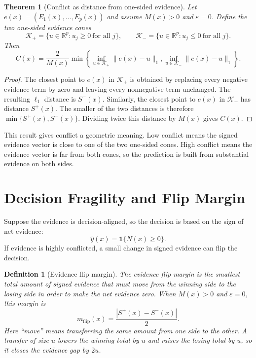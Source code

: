 \documentclass[11pt]{article}
\newtheorem{definition}{Definition}
\newtheorem{theorem}{Theorem}
\newcommand{\R}{\mathbb{R}}
\newcommand{\one}{\mathbf{1}}
\begin{document}
\begin{theorem}[Conflict as distance from one-sided evidence]
Let $e(x)=(E_1(x),\ldots,E_p(x))$ and assume $M(x)>0$ and $\varepsilon=0$. Define the two one-sided evidence cones
\[
\mathcal{K}_+=\{u\in\R^p:u_j\geq 0\ \text{for all }j\},
\qquad
\mathcal{K}_-=\{u\in\R^p:u_j\leq 0\ \text{for all }j\}.
\]
Then
\[
C(x)
=
\frac{2}{M(x)}
\min\left\{
\inf_{u\in\mathcal{K}_+}\|e(x)-u\|_1,
\inf_{u\in\mathcal{K}_-}\|e(x)-u\|_1
\right\}.
\]
\end{theorem}

\begin{proof}
The closest point to $e(x)$ in $\mathcal{K}_+$ is obtained by replacing every negative evidence term by zero and leaving every nonnegative term unchanged. The resulting $\ell_1$ distance is $S^-(x)$. Similarly, the closest point to $e(x)$ in $\mathcal{K}_-$ has distance $S^+(x)$. The smaller of the two distances is therefore $\min\{S^+(x),S^-(x)\}$. Dividing twice this distance by $M(x)$ gives $C(x)$.
\end{proof}

This result gives conflict a geometric meaning. Low conflict means the signed evidence vector is close to one of the two one-sided cones. High conflict means the evidence vector is far from both cones, so the prediction is built from substantial evidence on both sides.

\section{Decision Fragility and Flip Margin}

Suppose the evidence is decision-aligned, so the decision is based on the sign
of net evidence:
\[
\widehat{y}(x)=\one\{N(x)\geq 0\}.
\]
If evidence is highly conflicted, a small change in signed evidence can flip the decision.

\begin{definition}[Evidence flip margin]
The evidence flip margin is the smallest total amount of signed evidence that must move from the winning side to the losing side in order to make the net evidence zero. When $M(x)>0$ and $\varepsilon=0$, this margin is
\[
m_{\mathrm{flip}}(x)=\frac{|S^+(x)-S^-(x)|}{2}.
\]
Here ``move'' means transferring the same amount from one side to the other. A transfer of size $u$ lowers the winning total by $u$ and raises the losing total by $u$, so it closes the evidence gap by $2u$.
\end{definition}
\end{document}
